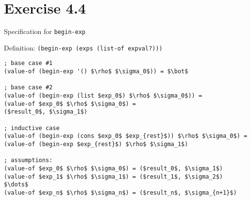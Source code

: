 \section*{Exercise 4.4}

Specification for \texttt{begin-exp}

Definition: \texttt{(begin-exp (exps (list-of expval?)))}


\begin{center}
\begin{lstlisting}[mathescape]
; base case #1
(value-of (begin-exp '() $\rho$ $\sigma_0$)) = $\bot$

; base case #2
(value-of (begin-exp (list $exp_0$) $\rho$ $\sigma_0$)) = 
(value-of $exp_0$ $\rho$ $\sigma_0$) =
($result_0$, $\sigma_1$)

; inductive case
(value-of (begin-exp (cons $exp_0$ $exp_{rest}$)) $\rho$ $\sigma_0$) =
(value-of (begin-exp $exp_{rest}$) $\rho$ $\sigma_1$)

; assumptions:
(value-of $exp_0$ $\rho$ $\sigma_0$) = ($result_0$, $\sigma_1$)
(value-of $exp_1$ $\rho$ $\sigma_1$) = ($result_1$, $\sigma_2$)
$\dots$
(value-of $exp_n$ $\rho$ $\sigma_n$) = ($result_n$, $\sigma_{n+1}$)


\end{lstlisting}
\end{center}
